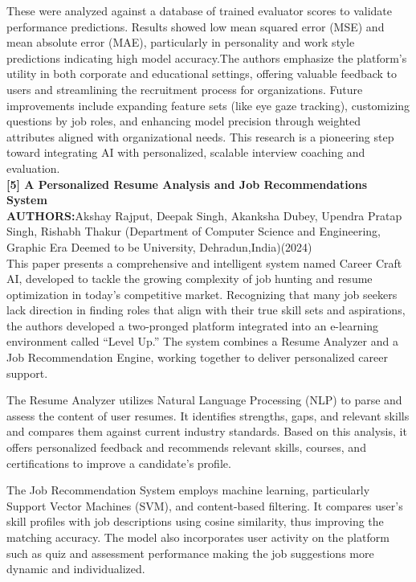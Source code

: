 \documentclass[a4paper, 12pt]{report}
\begin{document}
These were analyzed against a database of trained evaluator scores to validate performance predictions. Results showed low mean squared error (MSE) and mean absolute error (MAE), particularly in personality and work style predictions indicating high model accuracy.The authors emphasize the platform’s utility in both corporate and educational settings, offering valuable feedback to users and streamlining the recruitment process for organizations. Future improvements include expanding feature sets (like eye gaze tracking), customizing questions by job roles, and enhancing model precision through weighted attributes aligned with organizational needs. This research is a pioneering step toward integrating AI with personalized, scalable interview coaching and evaluation.\\
\noindent\textbf{[5] A Personalized Resume Analysis and Job Recommendations System}\\
\textbf{AUTHORS:}Akshay Rajput, Deepak Singh, Akanksha Dubey, Upendra Pratap Singh, Rishabh Thakur (Department of Computer Science and Engineering, Graphic Era Deemed to be University, Dehradun,India)(2024)\\
This paper presents a comprehensive and intelligent system named Career Craft AI, developed to tackle the growing complexity of job hunting and resume optimization in today’s competitive market. Recognizing that many job seekers lack direction in finding roles that align with their true skill sets and aspirations, the authors developed a two-pronged platform integrated into an e-learning environment called “Level Up.” The system combines a Resume Analyzer and a Job Recommendation Engine, working together to deliver personalized career support.

The Resume Analyzer utilizes Natural Language Processing (NLP) to parse and assess the content of user resumes. It identifies strengths, gaps, and relevant skills and compares them against current industry standards. Based on this analysis, it offers personalized feedback and recommends relevant skills, courses, and certifications to improve a candidate’s profile.

The Job Recommendation System employs machine learning, particularly Support Vector Machines (SVM), and content-based filtering. It compares user's skill profiles with job descriptions using cosine similarity, thus improving the matching accuracy. The model also incorporates user activity on the platform such as quiz and assessment performance making the job suggestions more dynamic and individualized.
\end{document}
